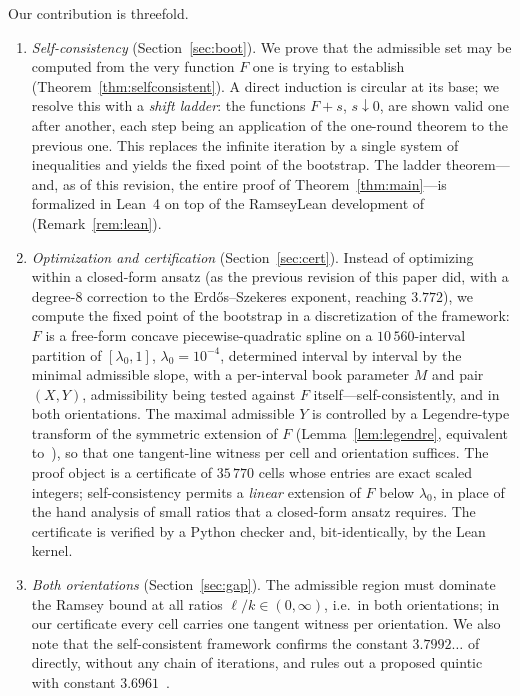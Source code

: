 \documentclass[11pt]{article}
\theoremstyle{definition}
\newcommand{\lam}{\lambda}
\begin{document}
Our contribution is threefold.
\begin{enumerate}[leftmargin=2em]
\item \emph{Self-consistency} (Section~\ref{sec:boot}).  We prove that the admissible set may be computed from the very function $F$ one is trying to establish (Theorem~\ref{thm:selfconsistent}).  A direct induction is circular at its base; we resolve this with a \emph{shift ladder}: the functions $F+s$, $s\downarrow0$, are shown valid one after another, each step being an application of the one-round theorem to the previous one.  This replaces the infinite iteration by a single system of inequalities and yields the fixed point of the bootstrap.  The ladder theorem---and, as of this revision, the entire proof of Theorem~\ref{thm:main}---is formalized in Lean~4 on top of the RamseyLean development of~\cite{GNNW} (Remark~\ref{rem:lean}).
\item \emph{Optimization and certification} (Section~\ref{sec:cert}).  Instead of optimizing within a closed-form ansatz (as the previous revision of this paper did, with a degree-8 correction to the Erd\H{o}s--Szekeres exponent, reaching $3.772$), we compute the fixed point of the bootstrap in a discretization of the framework: $F$ is a free-form concave piecewise-quadratic spline on a $10\,560$-interval partition of $[\lam_0,1]$, $\lam_0=10^{-4}$, determined interval by interval by the minimal admissible slope, with a per-interval book parameter $M$ and pair $(X,Y)$, admissibility being tested against $F$ itself---self-consistently, and in both orientations.  The maximal admissible $Y$ is controlled by a Legendre-type transform of the symmetric extension of $F$ (Lemma~\ref{lem:legendre}, equivalent to~\cite[Lemma~15]{GNNW}), so that one tangent-line witness per cell and orientation suffices.  The proof object is a certificate of $35\,770$ cells whose entries are exact scaled integers; self-consistency permits a \emph{linear} extension of $F$ below $\lam_0$, in place of the hand analysis of small ratios that a closed-form ansatz requires.  The certificate is verified by a Python checker and, bit-identically, by the Lean kernel.
\item \emph{Both orientations} (Section~\ref{sec:gap}).  The admissible region must dominate the Ramsey bound at all ratios $\ell/k\in(0,\infty)$, i.e.\ in both orientations; in our certificate every cell carries one tangent witness per orientation.  We also note that the self-consistent framework confirms the constant $3.7992\ldots$ of~\cite{GNNW} directly, without any chain of iterations, and rules out a proposed quintic with constant $3.6961$~\cite{HM}.
\end{enumerate}
\end{document}
